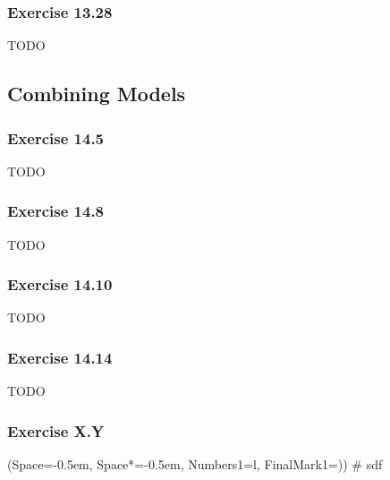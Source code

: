 \documentclass[12pt, a4paper]{article}
\newcommand{\listSpace}{-0.5em}%
\begin{document}
\subsubsection*{Exercise 13.28}
TODO





\subsection{Combining Models}
\subsubsection*{Exercise 14.5}
TODO


\subsubsection*{Exercise 14.8}
TODO


\subsubsection*{Exercise 14.10}
TODO


\subsubsection*{Exercise 14.14}
TODO



\subsubsection*{Exercise X.Y}
\begin{easylist}[enumerate]
	\ListProperties(Space=\listSpace, Space*=\listSpace, Numbers1=l, FinalMark1={)})
	# sdf
\end{easylist}





































\end{document}
